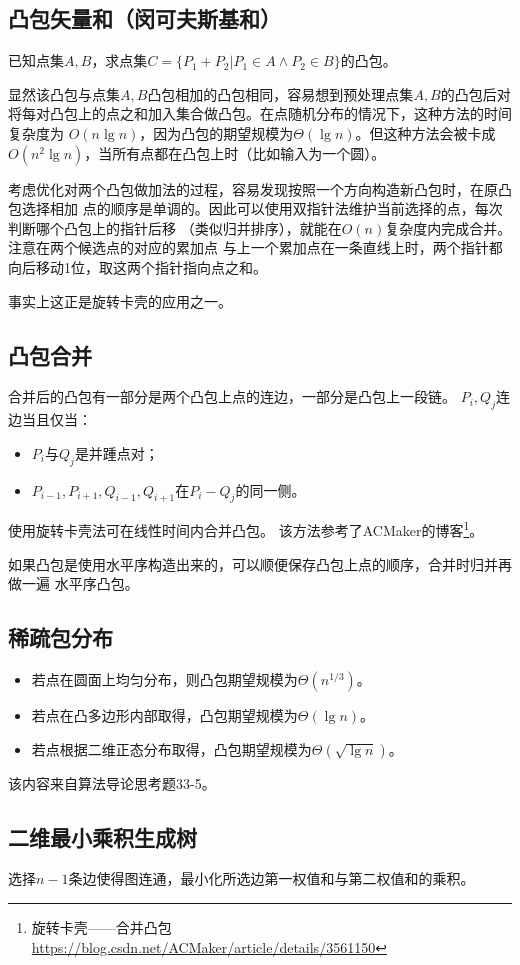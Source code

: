 \subsection{凸包矢量和（闵可夫斯基和）}
已知点集$A,B$，求点集$C=\{P_1+P_2|P_1\in A \land P_2\in B\}$的凸包。

显然该凸包与点集$A,B$凸包相加的凸包相同，容易想到预处理点集$A,B$的凸包后对
将每对凸包上的点之和加入集合做凸包。在点随机分布的情况下，这种方法的时间复杂度为
$O(n \lg n)$，因为凸包的期望规模为$\Theta(\lg n)$。但这种方法会被卡成
$O(n^2 \lg n)$，当所有点都在凸包上时（比如输入为一个圆）。

考虑优化对两个凸包做加法的过程，容易发现按照一个方向构造新凸包时，在原凸包选择相加
点的顺序是单调的。因此可以使用双指针法维护当前选择的点，每次判断哪个凸包上的指针后移
（类似归并排序），就能在$O(n)$复杂度内完成合并。注意在两个候选点的对应的累加点
与上一个累加点在一条直线上时，两个指针都向后移动1位，取这两个指针指向点之和。

事实上这正是旋转卡壳的应用之一。
\subsection{凸包合并}
合并后的凸包有一部分是两个凸包上点的连边，一部分是凸包上一段链。
$P_i,Q_j$连边当且仅当：
\begin{itemize}
	\item $P_i$与$Q_j$是并踵点对；
	\item $P_{i-1},P_{i+1},Q_{i-1},Q_{i+1}$在$P_i-Q_j$的同一侧。
\end{itemize}
使用旋转卡壳法可在线性时间内合并凸包。
该方法参考了ACMaker的博客\footnote{
	旋转卡壳——合并凸包
	\url{https://blog.csdn.net/ACMaker/article/details/3561150}
}。

如果凸包是使用水平序构造出来的，可以顺便保存凸包上点的顺序，合并时归并再做一遍
水平序凸包。
\subsection{稀疏包分布}
\begin{itemize}
	\item 若点在圆面上均匀分布，则凸包期望规模为$\Theta(n^{1/3})$。
	\item 若点在凸多边形内部取得，凸包期望规模为$\Theta(\lg n)$。
	\item 若点根据二维正态分布取得，凸包期望规模为$\Theta(\sqrt{\lg n})$。
\end{itemize}
该内容来自算法导论\cite{ITA3}思考题33-5。
\subsection{二维最小乘积生成树}
选择$n-1$条边使得图连通，最小化所选边第一权值和与第二权值和的乘积。

